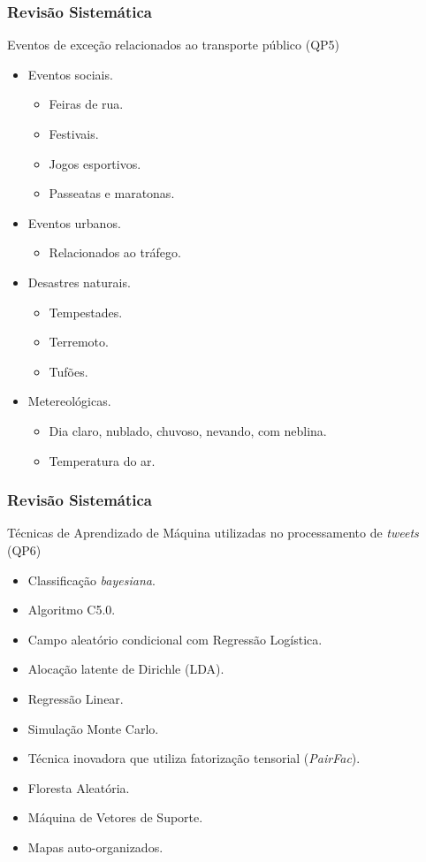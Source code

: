\documentclass{beamer}
\begin{document}
\begin{frame}
\frametitle{Revisão Sistemática}
\begin{block}{Eventos de exceção relacionados ao transporte público (QP5)}
\begin{itemize}
\item Eventos sociais.
\begin{itemize}
\item Feiras de rua.
\item Festivais.
\item Jogos esportivos.
\item Passeatas e maratonas.
\end{itemize}

\item Eventos urbanos.
\begin{itemize}
\item Relacionados ao tráfego.
\end{itemize}

\item Desastres naturais.
\begin{itemize}
\item Tempestades.
\item Terremoto.
\item Tufões.
\end{itemize}

\item Metereológicas.
\begin{itemize}
\item Dia claro, nublado, chuvoso, nevando, com neblina.
\item Temperatura do ar.
\end{itemize}

\end{itemize}
\end{block}
\end{frame}
\begin{frame}
\frametitle{Revisão Sistemática}
\begin{block}{Técnicas de Aprendizado de Máquina utilizadas no processamento de \textit{tweets} (QP6)}
\begin{itemize}
\item Classificação \textit{bayesiana}.
\item Algoritmo C5.0.
\item Campo aleatório condicional com Regressão Logística.
\item Alocação latente de Dirichle (LDA).
\item Regressão Linear.
\item Simulação Monte Carlo.
\item Técnica inovadora que utiliza fatorização tensorial   (\textit{PairFac}).
\item Floresta Aleatória.
\item Máquina de Vetores de Suporte.
\item Mapas auto-organizados.
\end{itemize}

\end{block}
\end{frame}
\end{document}
